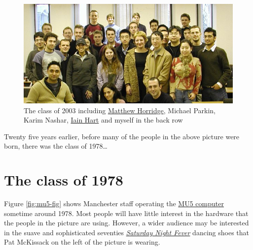 \documentclass[
  12pt,
]{book}
\begin{document}
\begin{figure}

{\centering \includegraphics[width=1\linewidth]{images/msc-2003} 

}

\caption{The class of 2003 including \href{https://web.stanford.edu/~horridge/}{Matthew Horridge}, Michael Parkin, Karim Nashar, \href{https://staffnet.cs.manchester.ac.uk/techso/}{Iain Hart} and myself in the back row}\label{fig:msc-fig}
\end{figure}



Twenty five years earlier, before many of the people in the above picture were born, there was the class of 1978\ldots{}

\hypertarget{y1978}{%
\section{The class of 1978}\label{y1978}}

Figure \ref{fig:mu5-fig} shows Manchester staff operating the \href{https://en.wikipedia.org/wiki/Manchester_computers\#MU5}{MU5 computer} sometime around 1978. Most people will have little interest in the hardware that the people in the picture are using. However, a wider audience may be interested in the suave and sophisticated seventies \emph{\href{https://en.wikipedia.org/wiki/Saturday_Night_Fever}{Saturday Night Fever}} dancing shoes that Pat McKissack on the left of the picture is wearing. \citep{nightfever}
\end{document}
